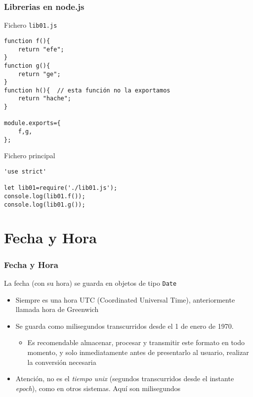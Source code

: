 \documentclass[ucs]{beamer}
\begin{document}
\begin{frame}[fragile]
\frametitle{Librerias en node.js}

Fichero \verb|lib01.js|
  \begin{scriptsize}
  \begin{verbatim}
function f(){
    return "efe";
}
function g(){
    return "ge";
}
function h(){  // esta función no la exportamos
    return "hache";
}

module.exports={
    f,g,
};
  \end{verbatim}
  \end{scriptsize}

Fichero principal

  \begin{scriptsize}
  \begin{verbatim}
'use strict'

let lib01=require('./lib01.js');
console.log(lib01.f());
console.log(lib01.g());
  \end{verbatim}
  \end{scriptsize}

\end{frame}


\section{Fecha y Hora}
\begin{frame}[fragile]
\frametitle{Fecha y Hora }
La fecha (con su hora) se guarda en objetos de tipo 
\verb|Date|

\begin{itemize}
\item
Siempre es una hora UTC (Coordinated Universal Time), anteriormente
llamada hora de Greenwich 

\item
Se guarda como milisegundos transcurridos desde el 1 de enero de 1970.

    \begin{itemize}
    \item
Es recomendable almacenar, procesar y transmitir este formato en todo momento, y solo 
inmediatamente antes de presentarlo al usuario, realizar la conversión necesaria
    \end{itemize}

\item
Atención, no es el \emph{tiempo unix} (segundos transcurridos desde el 
instante \emph{epoch}), como en otros sistemas. Aquí son milisegundos

\end{itemize}
\end{frame}
\end{document}
